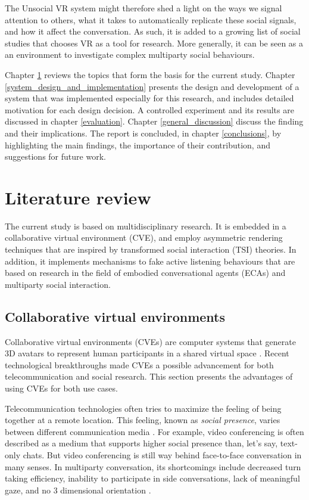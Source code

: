 \documentclass[]{simple-thesis}
\begin{document}
The Unsocial VR system might therefore shed a light on the ways we signal attention to others, what it takes to automatically replicate these social signals, and how it affect the conversation.
As such, it is added to a growing list of social studies that chooses VR as a tool for research.
More generally, it can be seen as a an environment to investigate complex multiparty social behaviours.

Chapter \ref{literature_review} reviews the topics that form the basis for the current study.
Chapter \ref{system_design_and_implementation} presents the design and development of a system that was implemented especially for this research, and includes detailed motivation for each design decision.
A controlled experiment and its results are discussed in chapter \ref{evaluation}.
Chapter \ref{general_discussion} discuss the finding and their implications.
The report is concluded, in chapter \ref{conclusions}, by highlighting the main findings, the importance of their contribution, and suggestions for future work.


\chapter{Literature review}\label{literature_review}

The current study is based on multidisciplinary research.
It is embedded in a collaborative virtual environment (CVE), and employ asymmetric rendering techniques that are inspired by transformed social interaction (TSI) theories.
In addition, it implements mechanisms to fake active listening behaviours that are based on research in the field of embodied conversational agents (ECAs) and multiparty social interaction.

\section{Collaborative virtual environments}

Collaborative virtual environments (CVEs) are computer systems that generate 3D avatars to represent human participants in a shared virtual space \citep{Bailenson2004}.
Recent technological breakthroughs made CVEs a possible advancement for both telecommunication and social research.
This section presents the advantages of using CVEs for both use cases.

Telecommunication technologies often tries to maximize the feeling of being together at a remote location.
This feeling, known as \textit{social presence}, varies between different communication media \citep{Short1976}.
For example, video conferencing is often described as a medium that supports higher social presence than, let's say, text-only chats.
But video conferencing is still way behind face-to-face conversation in many senses.
In multiparty conversation, its shortcomings include decreased turn taking efficiency, inability to participate in side conversations, lack of meaningful gaze, and no 3 dimensional orientation \citep{Isaacs1994}.
\end{document}
